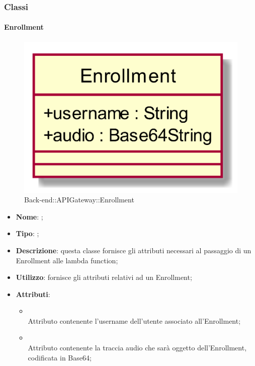 \subsubsection{Classi}
\hypertarget{Enrollment_label}{\paragraph{Enrollment}}
\begin{figure}[h]
	\centering
	\includegraphics[width=\textwidth,height=\textheight,keepaspectratio]{images/ClassEnrollment.png}
	\caption{Back-end::APIGateway::Enrollment}
\end{figure}
\begin{itemize}
	\item \textbf{Nome}: ;
	\item \textbf{Tipo}: ;
	\item \textbf{Descrizione}: questa classe fornisce gli attributi necessari al passaggio di un Enrollment alle lambda function;
	\item \textbf{Utilizzo}: fornisce gli attributi relativi ad un Enrollment;
	\item \textbf{Attributi}:
	\begin{itemize}
		\item[]  \\
		Attributo contenente l'username dell'utente associato all'Enrollment;
		\item[]  \\
		Attributo contenente la traccia audio che sarà oggetto dell'Enrollment, codificata in Base64;
	\end{itemize}
\end{itemize}

